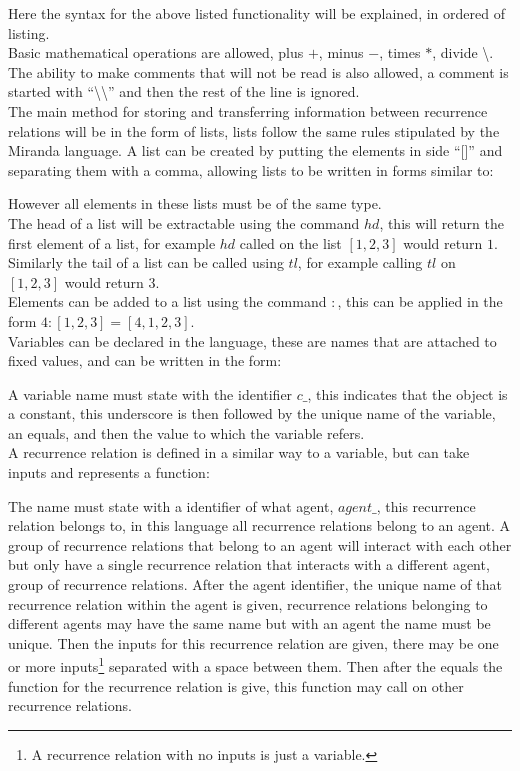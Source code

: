 \documentclass{article}
\begin{document}
Here the syntax for the above listed functionality will be explained, in ordered of listing.\\
Basic mathematical operations are allowed, plus $+$, minus $-$, times $*$, divide \textbackslash. The ability to make comments that will not be read is also allowed, a comment is started with ``\textbackslash\textbackslash'' and then the rest of the line is ignored.\\ 
The main method for storing and transferring information between recurrence relations will be in the form of lists, lists follow the same rules stipulated by the Miranda language. A list can be created by putting the elements in side ``[]'' and separating them with a comma, allowing lists to be written in forms similar to:

However all elements in these lists must be of the same type.\\
The head of a list will be extractable using the command $hd$, this will return the first element of a list, for example $hd$ called on the list $[1,2,3]$ would return $1$. Similarly the tail of a list can be called using $tl$, for example calling $tl$ on $[1,2,3]$ would return $3$.\\  
Elements can be added to a list using the command $:$, this can be applied in the form $4:[1,2,3] = [4,1,2,3]$.\\
Variables can be declared in the language, these are names that are attached to fixed values, and can be written in the form: 

A variable name must state with the identifier $c\_$, this indicates that the object is a constant, this underscore is then followed by the unique name of the variable, an equals, and then the value to which the variable refers.\\   
A recurrence relation is defined in a similar way to a variable, but can take inputs and represents a function:

The name must state with a identifier of what agent, $agent\_$, this recurrence relation belongs to, in this language all recurrence relations belong to an agent. A group of recurrence relations that belong to an agent will interact with each other but only have a single recurrence relation that interacts with a different agent, group of recurrence relations. After the agent identifier, the unique name of that recurrence relation within the agent is given, recurrence relations belonging to different agents may have the same name but with an agent the name must be unique. Then the inputs for this recurrence relation are given, there may be one or more inputs\footnote{A recurrence relation with no inputs is just a variable.} separated with a space between them. Then after the equals the function for the recurrence relation is give, this function may call on other recurrence relations.\\
\end{document}
